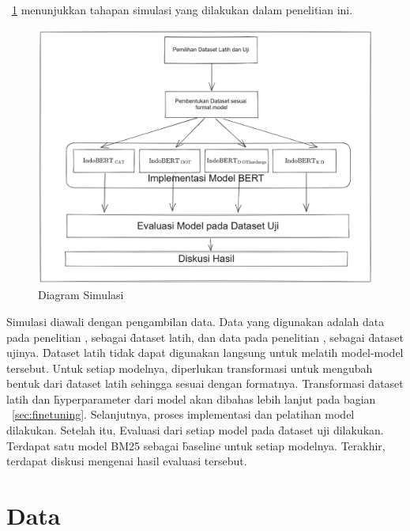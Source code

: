 \pic~\ref{fig:diagram-simulasi} menunjukkan tahapan simulasi yang dilakukan dalam penelitian ini.
\begin{figure}
    \centering
    \includegraphics[width=1\textwidth]{assets/pics/alursimulasi.png}
    \caption{Diagram Simulasi}
    \label{fig:diagram-simulasi}

\end{figure}

Simulasi diawali dengan pengambilan data. Data yang digunakan adalah data pada penelitian \cite{mmarco}, sebagai \f{dataset} latih, dan data pada penelitian \cite{mrtydi}, \cite{miracl} sebagai \f{dataset} ujinya. \f{Dataset} latih tidak dapat digunakan langsung untuk melatih model-model tersebut. Untuk setiap modelnya, diperlukan transformasi untuk mengubah bentuk dari \f{dataset} latih sehingga sesuai dengan formatnya. Transformasi \f{dataset} latih dan \f{hyperparameter} dari model akan dibahas lebih lanjut pada bagian \sect~\ref{sec:finetuning}. Selanjutnya, proses implementasi dan pelatihan model dilakukan. Setelah itu, Evaluasi dari setiap model pada \f{dataset} uji dilakukan. Terdapat satu model BM25 sebagai \f{baseline} untuk setiap modelnya. Terakhir, terdapat diskusi mengenai hasil evaluasi tersebut.

\section{Data}
\label{sec:dataset}

